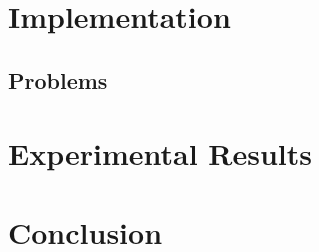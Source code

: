 \documentclass[11pt]{article}
\begin{document}
%
%
%
%
%
%
%
%

\section{Implementation}



\subsection{Problems}



\section{Experimental Results}





\section{Conclusion}






%
%
\nocite{FPBR}
\nocite{FPBR2}



%
%
\end{document}
